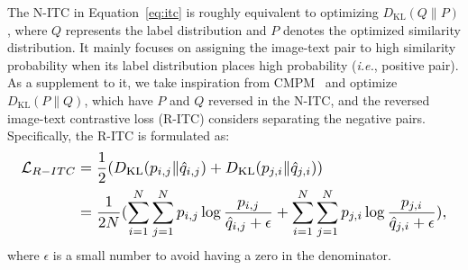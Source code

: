 \documentclass[letterpaper]{article} %
\begin{document}
The N-ITC in Equation~\ref{eq:itc} is roughly equivalent to optimizing $D_{\text{KL}}(Q\| P)$, where $Q$ represents the label distribution and $P$ denotes the optimized similarity distribution. 
It mainly focuses on assigning the image-text pair to high similarity probability when its label distribution places high probability (\emph{i.e.}, positive pair).
As a supplement to it, we take inspiration from CMPM~\cite{zhang2018deep} and optimize $D_{\text{KL}}(P\| Q)$, which have $P$ and $Q$ reversed in the N-ITC, and the reversed image-text contrastive loss (R-ITC) considers separating the negative pairs.
Specifically, the R-ITC is formulated as:
\begin{equation}
\resizebox{0.98\columnwidth}{!}{%
$\begin{aligned}
    \mathcal{L}_{R-ITC} &= \frac{1}{2} (D_{\text{KL}}(p_{i,j} \| \hat{q}_{i,j})+ D_{\text{KL}}(p_{j,i} \| \hat{q}_{j,i})) \\
    &= \frac{1}{2N} (\sum_{i=1}^{N}\sum_{j=1}^{N} p_{i,j} \log{\frac{p_{i,j}}{\hat{q}_{i,j}+\epsilon}}+ \sum_{i=1}^{N}\sum_{j=1}^{N} p_{j,i} \log{\frac{p_{j,i}}{\hat{q}_{j,i}+\epsilon}}),
\end{aligned}$%
}
\end{equation}
where $\epsilon$ is a small number to avoid having a zero in the denominator.
\end{document}
